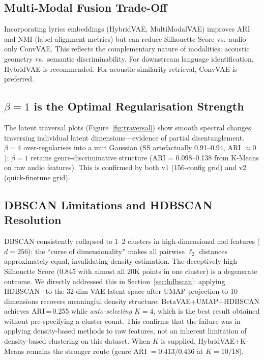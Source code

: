 \documentclass{article}
\begin{document}
\subsection{Multi-Modal Fusion Trade-Off}

Incorporating lyrics embeddings (HybridVAE, MultiModalVAE) improves ARI and NMI
(label-alignment metrics) but can reduce Silhouette Score vs.\ audio-only ConvVAE.
This reflects the complementary nature of modalities: acoustic geometry vs.\ semantic
discriminability. For downstream language identification, HybridVAE is recommended.
For acoustic similarity retrieval, ConvVAE is preferred.

\subsection{$\beta\!=\!1$ is the Optimal Regularisation Strength}

The latent traversal plots (Figure~\ref{fig:traversal}) show smooth spectral changes
traversing individual latent dimensions---evidence of partial disentanglement.
$\beta\!=\!4$ over-regularises into a unit Gaussian (SS artefactually 0.91--0.94,
ARI $\approx 0$); $\beta\!=\!1$ retains genre-discriminative structure
(ARI = 0.098--0.138 from K-Means on raw audio features). This is confirmed by both
v1 (156-config grid) and v2 (quick-finetune grid).

\subsection{DBSCAN Limitations and HDBSCAN Resolution}

DBSCAN consistently collapsed to 1--2 clusters in high-dimensional mel features
($d\!=\!256$): the ``curse of dimensionality'' makes all pairwise $\ell_2$ distances
approximately equal, invalidating density estimation. The deceptively high Silhouette
Score (0.845 with almost all 20K points in one cluster) is a degenerate outcome.
We directly addressed this in Section~\ref{sec:hdbscan}: applying
HDBSCAN~\cite{campello2013density} to the 32-dim VAE latent space after UMAP projection
to 10 dimensions recovers meaningful density structure. BetaVAE+UMAP+HDBSCAN achieves
ARI\,=\,0.255 while \emph{auto-selecting} $K\!=\!4$, which is the best result obtained
without pre-specifying a cluster count. This confirms that the failure was in applying
density-based methods to raw features, not an inherent limitation of density-based
clustering on this dataset. When $K$ is supplied, HybridVAE+K-Means remains the stronger
route (genre ARI $=0.413$/$0.436$ at $K\!=\!10/18$).
\end{document}
